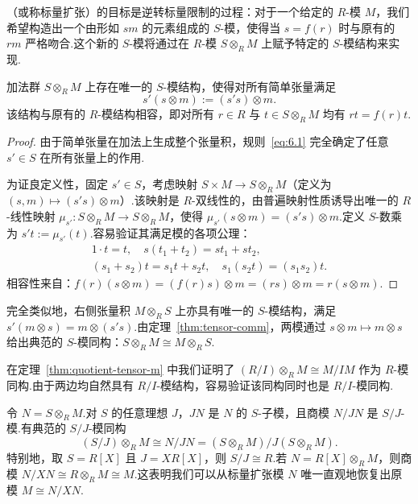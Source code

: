 （或称标量扩张）的目标是逆转标量限制的过程：对于一个给定的 $R$-模 $M$，我们希望构造出一个由形如 $sm$ 的元素组成的 $S$-模，使得当 $s = f(r)$ 时与原有的 $rm$ 严格吻合.这个新的 $S$-模将通过在 $R$-模 $S \otimes_R M$ 上赋予特定的 $S$-模结构来实现.

\begin{theorem}\label{thm:s-tensor-m-struct}
加法群 $S \otimes_R M$ 上存在唯一的 $S$-模结构，使得对所有简单张量满足
\begin{equation}
  s'(s \otimes m) := (s's) \otimes m. \label{eq:6.1}
\end{equation}
该结构与原有的 $R$-模结构相容，即对所有 $r \in R$ 与 $t \in S \otimes_R M$ 均有 $rt = f(r)t$.
\end{theorem}

\begin{proof}
由于简单张量在加法上生成整个张量积，规则~\eqref{eq:6.1} 完全确定了任意 $s' \in S$ 在所有张量上的作用.

为证良定义性，固定 $s' \in S$，考虑映射 $S \times M \to S \otimes_R M$（定义为 $(s, m) \mapsto (s's) \otimes m$）.该映射是 $R$-双线性的，由普遍映射性质诱导出唯一的 $R$-线性映射 $\mu_{s'} \colon S \otimes_R M \to S \otimes_R M$，使得 $\mu_{s'}(s \otimes m) = (s's) \otimes m$.定义 $S$-数乘为 $s't := \mu_{s'}(t)$.容易验证其满足模的各项公理：
\begin{gather*}
  1 \cdot t = t, \quad s(t_1 + t_2) = st_1 + st_2, \\
  (s_1 + s_2)t = s_1 t + s_2 t, \quad s_1(s_2 t) = (s_1 s_2)t.
\end{gather*}
相容性来自：$f(r)(s \otimes m) = (f(r)s) \otimes m = (rs) \otimes m = r(s \otimes m)$.
\end{proof}

完全类似地，右侧张量积 $M \otimes_R S$ 上亦具有唯一的 $S$-模结构，满足 $s'(m \otimes s) = m \otimes (s's)$.由定理~\ref{thm:tensor-comm}，两模通过 $s \otimes m \mapsto m \otimes s$ 给出典范的 $S$-模同构：$S \otimes_R M \cong M \otimes_R S$.

\begin{example}\label{ex:r-mod-i-base-ext}
在定理~\ref{thm:quotient-tensor-m} 中我们证明了 $(R/I) \otimes_R M \cong M/IM$ 作为 $R$-模同构.由于两边均自然具有 $R/I$-模结构，容易验证该同构同时也是 $R/I$-模同构.
\end{example}

\begin{example}\label{ex:s-mod-j-base-ext}
令 $N = S \otimes_R M$.对 $S$ 的任意理想 $J$，$JN$ 是 $N$ 的 $S$-子模，且商模 $N/JN$ 是 $S/J$-模.有典范的 $S/J$-模同构
\[
  (S/J) \otimes_R M \cong N/JN = (S \otimes_R M) / J(S \otimes_R M).
\]
特别地，取 $S = R[X]$ 且 $J = XR[X]$，则 $S/J \cong R$.若 $N = R[X] \otimes_R M$，则商模 $N/XN \cong R \otimes_R M \cong M$.这表明我们可以从标量扩张模 $N$ 唯一直观地恢复出原模 $M \cong N/XN$.
\end{example}


